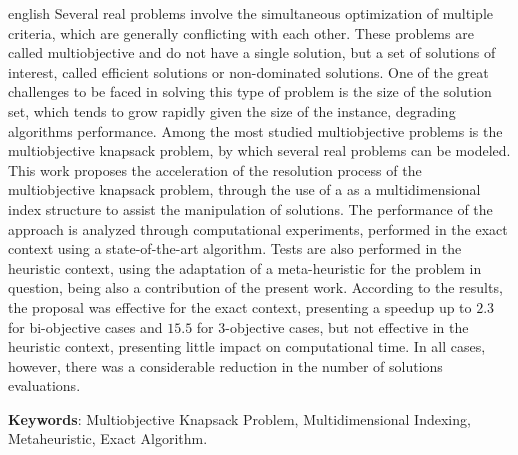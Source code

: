 \begin{resumo}[Abstract]
\begin{otherlanguage*}{english}
Several real problems involve the simultaneous optimization of multiple criteria,
which are generally conflicting with each other.
These problems are called multiobjective and
do not have a single solution, but a set of solutions of interest, called efficient solutions
or non-dominated solutions.
One of the great challenges to be faced in solving this type of problem is the
size of the solution set, which tends to grow rapidly given the size of the instance,
degrading algorithms performance.
Among the most studied multiobjective problems is the multiobjective knapsack problem,
by which several real problems can be modeled.
This work proposes the acceleration of the resolution process of the multiobjective knapsack problem,
through the use of a \kdtree {} as a multidimensional index structure
to assist the manipulation of solutions.
The performance of the approach is analyzed through computational experiments,
performed in the exact context using a state-of-the-art algorithm.
Tests are also performed in the heuristic context, using the adaptation
of a meta-heuristic for the problem in question, being also a contribution of the present work.
According to the results, the proposal was effective for the exact context, presenting a speedup up to $2.3$
for bi-objective cases and $15.5$ for 3-objective cases, but not
effective in the heuristic context, presenting little impact on computational time.
In all cases, however, there was a considerable reduction in the number of solutions evaluations.
\vspace{\onelineskip}

\noindent

\textbf{Keywords}:
Multiobjective Knapsack Problem,
Multidimensional Indexing,
Metaheuristic,
Exact Algorithm.
\end{otherlanguage*}
\end{resumo}



%
%